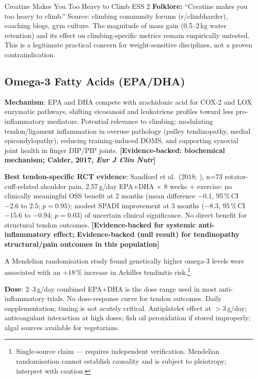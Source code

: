 \begin{folklorebox}{Creatine Makes You Too Heavy to Climb \cdot \folkloreverified \cdot ESS 2}
\textbf{Folklore:} ``Creatine makes you too heavy to climb.'' Source: climbing community forums (r/climbharder), coaching blogs, gym culture. The magnitude of mass gain (0.5--2\,kg water retention) and its effect on climbing-specific metrics remain empirically untested. This is a legitimate practical concern for weight-sensitive disciplines, not a proven contraindication.
\end{folklorebox}

\subsection{Omega-3 Fatty Acids (EPA/DHA)}
\label{subsec:omega3}

\textbf{Mechanism}: EPA and DHA compete with arachidonic acid for COX-2 and LOX enzymatic pathways, shifting eicosanoid and leukotriene profiles toward less pro-inflammatory mediators. Potential relevance to climbing: modulating tendon/ligament inflammation in overuse pathology (pulley tendinopathy, medial epicondylopathy), reducing training-induced DOMS, and supporting synovial joint health in finger DIP/PIP joints. \textbf{[Evidence-backed: biochemical mechanism; Calder, 2017, \textit{Eur J Clin Nutr}]}

\textbf{Best tendon-specific RCT evidence}: Sandford et al.\ (2018; \cite{SSWL18}), n=73 rotator-cuff-related shoulder pain, 2.57\,g/day EPA+DHA $\times$ 8 weeks $+$ exercise: no clinically meaningful OSS benefit at 2 months (mean difference $-0.1$, 95\,\%\,CI $-2.6$ to $2.5$; $p{=}0.95$); modest SPADI improvement at 3 months ($-8.3$, 95\,\%\,CI $-15.6$ to $-0.94$; $p{=}0.03$) of uncertain clinical significance. No direct benefit for structural tendon outcomes. \textbf{[Evidence-backed for systemic anti-inflammatory effect; Evidence-backed (null result) for tendinopathy structural/pain outcomes in this population]}

A Mendelian randomisation study found genetically higher omega-3 levels were associated with an $+18\,\%$ increase in Achilles tendinitis risk.\footnote{Single-source claim --- requires independent verification. Mendelian randomisation cannot establish causality and is subject to pleiotropy; interpret with caution.}

\textbf{Dose}: 2--3\,g/day combined EPA+DHA is the dose range used in most anti-inflammatory trials. No dose-response curve for tendon outcomes. Daily supplementation; timing is not acutely critical. Antiplatelet effect at $>$3\,g/day; anticoagulant interaction at high doses; fish oil peroxidation if stored improperly; algal sources available for vegetarians.

